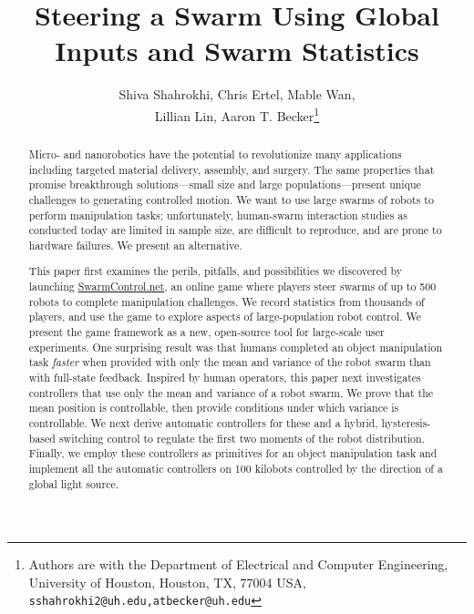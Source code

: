 \documentclass[11pt]{article}
\begin{document}
    \tableofcontents
    \setcounter{tocdepth}{3}
    \newpage
 

\title{\LARGE \bf Steering a Swarm Using Global Inputs and Swarm Statistics}

\author{Shiva Shahrokhi, Chris Ertel, Mable Wan,\\ Lillian Lin, Aaron T. Becker\thanks{Authors are with the Department of Electrical and Computer Engineering, University of Houston, Houston, TX, 77004 USA, {\tt\small sshahrokhi2@uh.edu,atbecker@uh.edu}}
} %
\maketitle
\begin{abstract}
Micro- and nanorobotics have the potential to revolutionize many applications including targeted material delivery, assembly, and surgery.  The same properties that promise breakthrough solutions---small size and large populations---present unique challenges to generating controlled motion. We want to use large swarms of robots to perform manipulation tasks; unfortunately, human-swarm interaction studies as conducted today are limited in sample size, are difficult to reproduce, and are prone to hardware failures. We present an alternative.

This paper first examines the perils, pitfalls, and possibilities we discovered by launching \href{http://www.swarmcontrol.net}{SwarmControl.net}, an online game where players steer swarms of up to 500 robots to complete manipulation challenges. We record statistics from thousands of players, and use the game to explore aspects of large-population robot control. We present the game framework as a new, open-source tool for large-scale user experiments. One surprising result was that humans completed an object manipulation task \emph{faster} when provided with only the mean and variance of the robot swarm than with full-state feedback. Inspired by human operators, this paper next investigates controllers that use only the mean and variance of a robot swarm. We prove that the mean position is controllable, then provide conditions under which variance is controllable.  We next derive automatic controllers for these and a hybrid, hysteresis-based switching control to regulate the first two moments of the robot distribution.  Finally, we employ these controllers as primitives for an object manipulation task and implement all the automatic controllers on 100 kilobots controlled by the direction of a global light source.
\end{abstract}
\end{document}
